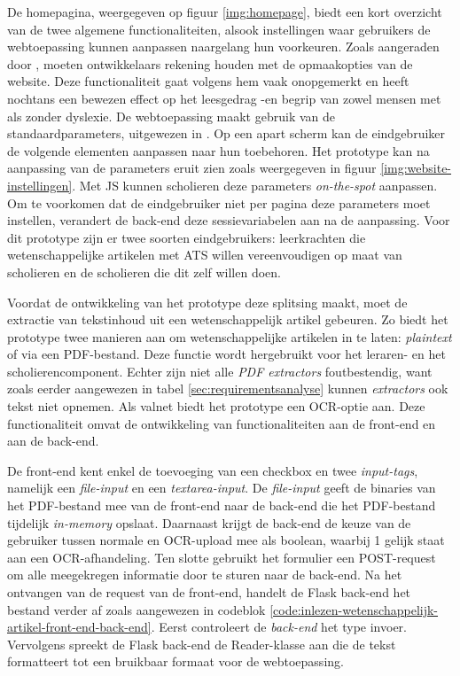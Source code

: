 De homepagina, weergegeven op figuur \ref{img:homepage}, biedt een kort overzicht van de twee algemene functionaliteiten, alsook instellingen waar gebruikers de webtoepassing kunnen aanpassen naargelang hun voorkeuren. Zoals aangeraden door \textcite{Harvard2023}, moeten ontwikkelaars rekening houden met de opmaakopties van de website. Deze functionaliteit gaat volgens hem vaak onopgemerkt en heeft nochtans een bewezen effect op het leesgedrag -en begrip van zowel mensen met als zonder dyslexie. De webtoepassing maakt gebruik van de standaardparameters, uitgewezen in \textcite{Rello2013a, Rello2013b}. Op een apart scherm kan de eindgebruiker de volgende elementen aanpassen naar hun toebehoren. Het prototype kan na aanpassing van de parameters eruit zien zoals weergegeven in figuur \ref{img:website-instellingen}. Met JS kunnen scholieren deze parameters \textit{on-the-spot} aanpassen. Om te voorkomen dat de eindgebruiker niet per pagina deze parameters moet instellen, verandert de back-end deze sessievariabelen aan na de aanpassing. Voor dit prototype zijn er twee soorten eindgebruikers: leerkrachten die wetenschappelijke artikelen met ATS willen vereenvoudigen op maat van scholieren en de scholieren die dit zelf willen doen.

\medspace

Voordat de ontwikkeling van het prototype deze splitsing maakt, moet de extractie van tekstinhoud uit een wetenschappelijk artikel gebeuren. Zo biedt het prototype twee manieren aan om wetenschappelijke artikelen in te laten: \textit{plaintext} of via een PDF-bestand. Deze functie wordt hergebruikt voor het leraren- en het scholierencomponent. Echter zijn niet alle \textit{PDF extractors} foutbestendig, want zoals eerder aangewezen in tabel \ref{sec:requirementsanalyse} kunnen \textit{extractors} ook tekst niet opnemen. Als valnet biedt het prototype een OCR-optie aan. Deze functionaliteit omvat de ontwikkeling van functionaliteiten aan de front-end en aan de back-end.

\medspace

De front-end kent enkel de toevoeging van een checkbox en twee \textit{input-tags}, namelijk een \textit{file-input} en een \textit{textarea-input}. De \textit{file-input} geeft de binaries van het PDF-bestand mee van de front-end naar de back-end die het PDF-bestand tijdelijk \textit{in-memory} opslaat. Daarnaast krijgt de back-end de keuze van de gebruiker tussen normale en OCR-upload mee als boolean, waarbij 1 gelijk staat aan een OCR-afhandeling. Ten slotte gebruikt het formulier een POST-request om alle meegekregen informatie door te sturen naar de back-end. Na het ontvangen van de request van de front-end, handelt de Flask back-end het bestand verder af zoals aangewezen in codeblok \ref{code:inlezen-wetenschappelijk-artikel-front-end-back-end}. Eerst controleert de \textit{back-end} het type invoer. Vervolgens spreekt de Flask back-end de Reader-klasse aan die de tekst formatteert tot een bruikbaar formaat voor de webtoepassing. 

